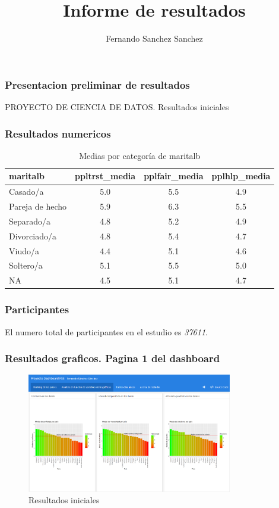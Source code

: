 \documentclass{beamer}
\title{Informe de resultados}
\author{Fernando Sanchez Sanchez}
\begin{document}


\begin{frame}
\frametitle{Presentacion preliminar de resultados}
PROYECTO DE CIENCIA DE DATOS.
Resultados iniciales
\end{frame}

\begin{frame}
\frametitle{Resultados numericos}

\begin{table}[ht]
\centering
\caption{Medias por categoría de maritalb}
\begin{tabular}{|l|c|c|c|}
\hline
maritalb & ppltrst\_media & pplfair\_media & pplhlp\_media \\
\hline
Casado/a & 5.0 & 5.5 & 4.9 \\
Pareja de hecho & 5.9 & 6.3 & 5.5 \\
Separado/a & 4.8 & 5.2 & 4.9 \\
Divorciado/a & 4.8 & 5.4 & 4.7 \\
Viudo/a & 4.4 & 5.1 & 4.6 \\
Soltero/a & 5.1 & 5.5 & 5.0 \\
NA & 4.5 & 5.1 & 4.7 \\
\hline
\end{tabular}
\end{table}


\end{frame}

\begin{frame}
\frametitle{Participantes}




El numero total de participantes en el estudio es \emph{37611}.


\end{frame}

\begin{frame}
\frametitle{Resultados graficos. Pagina 1 del dashboard}
\begin{figure}[ht]
\centering
\includegraphics[width=0.8\textwidth]{Figura_1.png}
\caption{Resultados iniciales}
\end{figure}
\end{frame}
\end{document}
